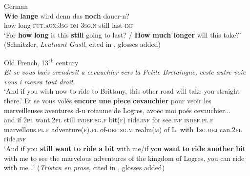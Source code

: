 \begin{exe}
	 German\\
	\gll \textbf{Wie} \textbf{lange} wird denn das \textbf{noch} dauer-n?\\
	how long \textsc{fut}.\textsc{aux}:3\textsc{sg} \textsc{dm} 3\textsc{sg}.\textsc{n} still last-\textsc{inf}\\
	\glt \lq For \textbf{how} \textbf{long} is this \textbf{still} going to last? / \textbf{How much longer} will this take?\rq{ }(Schnitzler, \textit{Leutnant Gustl}, cited in \cite[60]{Shetter1966}, glosses added)
 
	\ex Old French, 13\textsuperscript{th} century\label{exAdditiveOldFrenchRide}\\
	\textit{Et se vous baés orendroit a cevauchier vers la Petite Bretaingne, ceste autre voie vous i menra tout droit}.\\
	\lq And if you wish now to ride to Brittany, this other road will take you straight there.\rq{}
	\exi{}
	\gll  Et se vous volés \textbf{encore} \textbf{une} \textbf{piece} \textbf{cevauchier} pour veoir les merveilleuses aventures d-u roiaume de Logres, avoec moi poés cevauchier...\\
	and if 2\textsc{pl} want.2\textsc{pl} still \textsc{indef}.\textsc{sg}.\textsc{f} bit(\textsc{f}) ride.\textsc{inf} for see.\textsc{inf} \textsc{indef}.\textsc{pl}.\textsc{f} marvellous.\textsc{pl}.\textsc{f} adventure(\textsc{f}).\textsc{pl} of-\textsc{def}.\textsc{sg}.\textsc{m} realm(\textsc{m}) of L. with 1\textsc{sg}.\textsc{obj} can.2\textsc{pl} ride.\textsc{inf}\\
	\glt \lq And if you \textbf{still} \textbf{want} \textbf{to} \textbf{ride} \textbf{a} \textbf{bit} with me/if you \textbf{want} \textbf{to} \textbf{ride} \textbf{another} \textbf{bit} with me to see the marvelous adventures of the kingdom of Logres, you can ride with me...\rq{ }(\textit{Tristan en prose}, cited in \cite[163]{MosegaardHansen2008}, glosses added)
\end{exe}

